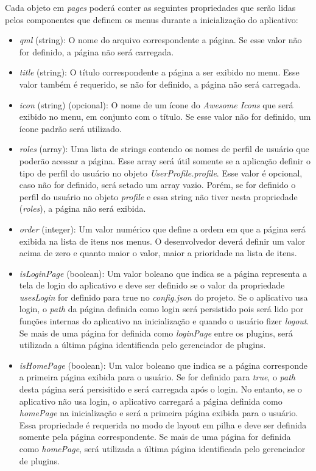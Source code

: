 Cada objeto em \textit{pages} poderá conter as seguintes propriedades que serão lidas pelos componentes que definem os menus durante a inicialização do aplicativo:

\begin{itemize}
	\item \textit{qml} (string): O nome do arquivo correspondente a página. Se esse valor não for definido, a página não será carregada.

	\item \textit{title} (string): O título correspondente a página a ser exibido no menu. Esse valor também é requerido, se não for definido, a página não será carregada.

	\item \textit{icon} (string) (opcional): O nome de um ícone do \textit{Awesome Icons} que será exibido no menu, em conjunto com o título. Se esse valor não for definido, um ícone padrão será utilizado.

	\item \textit{roles} (array): Uma lista de strings contendo os nomes de perfil de usuário que poderão acessar a página. Esse array será útil somente se a aplicação definir o tipo de perfil do usuário no objeto \textit{UserProfile.profile}. Esse valor é opcional, caso não for definido, será setado um array vazio. Porém, se for definido o perfil do usuário no objeto \textit{profile} e essa string não tiver nesta propriedade (\textit{roles}), a página não será exibida.

	\item \textit{order} (integer): Um valor numérico que define a ordem em que a página será exibida na lista de itens nos menus. O desenvolvedor deverá definir um valor acima de zero e quanto maior o valor, maior a prioridade na lista de itens.

	\item \textit{isLoginPage} (boolean): Um valor boleano que indica se a página representa a tela de login do aplicativo e deve ser definido se o valor da propriedade \textit{usesLogin} for definido para true no \textit{config.json} do projeto. Se o aplicativo usa login, o \textit{path} da página definida como login será persistido pois será lido por funções internas do aplicativo na inicialização e quando o usuário fizer \textit{logout}. Se mais de uma página for definida como \textit{loginPage} entre os plugins, será utilizada a última página identificada pelo gerenciador de plugins.

	\item \textit{isHomePage} (boolean): Um valor boleano que indica se a página corresponde a primeira página exibida para o usuário. Se for definido para \textit{true}, o \textit{path} desta página será persisitido e será carregada após o login. No entanto, se o aplicativo não usa login, o aplicativo carregará a página definida como \textit{homePage} na inicialização e será a primeira página exibida para o usuário. Essa propriedade é requerida no modo de layout em pilha e deve ser definida somente pela página correspondente. Se mais de uma página for definida como \textit{homePage}, será utilizada a última página identificada pelo gerenciador de plugins.


\end{itemize}
